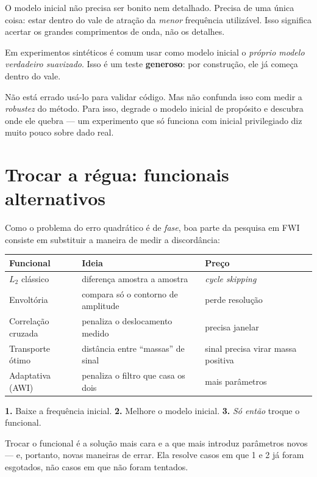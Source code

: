 \documentclass[11pt,a4paper,oneside]{report}
\begin{document}
O modelo inicial n\~ao precisa ser bonito nem detalhado. Precisa de uma
\'unica coisa: estar dentro do vale de atra\c{c}\~ao da \emph{menor}
frequ\^encia utiliz\'avel. Isso significa acertar os grandes comprimentos de
onda, n\~ao os detalhes.

\begin{armadilha}
Em experimentos sint\'eticos \'e comum usar como modelo inicial o
\emph{pr\'oprio modelo verdadeiro suavizado}. Isso \'e um teste
\textbf{generoso}: por constru\c{c}\~ao, ele j\'a come\c{c}a dentro do vale.

N\~ao est\'a errado us\'a-lo para validar c\'odigo. Mas n\~ao confunda isso
com medir a \emph{robustez} do m\'etodo. Para isso, degrade o modelo inicial
de prop\'osito e descubra onde ele quebra --- um experimento que s\'o
funciona com inicial privilegiado diz muito pouco sobre dado real.
\end{armadilha}

\section{Trocar a r\'egua: funcionais alternativos}

Como o problema do erro quadr\'atico \'e de \emph{fase}, boa parte da
pesquisa em FWI consiste em substituir a maneira de medir a discord\^ancia:

\begin{center}
\begin{tabular}{@{}lll@{}}
\toprule
\textbf{Funcional} & \textbf{Ideia} & \textbf{Pre\c{c}o} \\
\midrule
$L_2$ cl\'assico & diferen\c{c}a amostra a amostra & \emph{cycle skipping} \\
Envolt\'oria & compara s\'o o contorno de amplitude & perde resolu\c{c}\~ao \\
Correla\c{c}\~ao cruzada & penaliza o deslocamento medido & precisa janelar \\
Transporte \'otimo & dist\^ancia entre ``massas'' de sinal & sinal precisa virar massa positiva \\
Adaptativa (AWI) & penaliza o filtro que casa os dois & mais par\^ametros \\
\bottomrule
\end{tabular}
\end{center}

\begin{pratica}
\textbf{1.} Baixe a frequ\^encia inicial. \quad
\textbf{2.} Melhore o modelo inicial. \quad
\textbf{3.} \emph{S\'o ent\~ao} troque o funcional.

Trocar o funcional \'e a solu\c{c}\~ao mais cara e a que mais introduz
par\^ametros novos --- e, portanto, novas maneiras de errar. Ela resolve casos
em que 1 e 2 j\'a foram esgotados, n\~ao casos em que n\~ao foram tentados.
\end{pratica}
\end{document}
